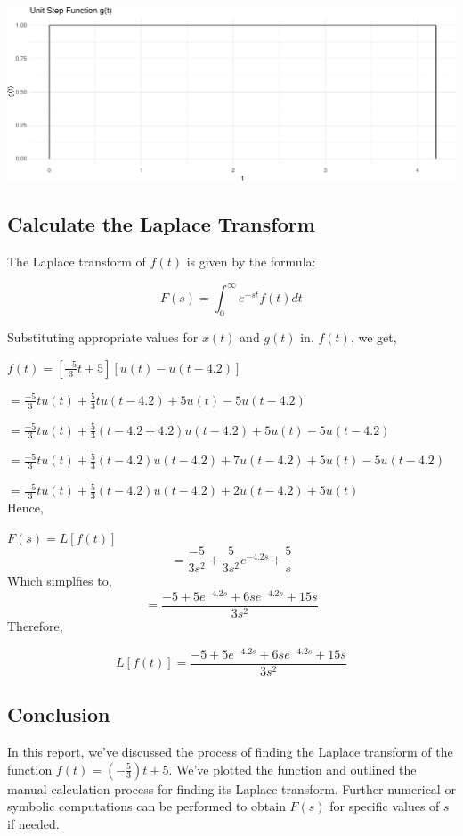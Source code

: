 \documentclass[
]{article}
\begin{document}
\includegraphics{laplace_transform_files/figure-latex/plot-function3-1.pdf}

\hypertarget{calculate-the-laplace-transform}{%
\subsection{Calculate the Laplace
Transform}\label{calculate-the-laplace-transform}}

The Laplace transform of \(f(t)\) is given by the formula:

\[ F(s) = \int_0^{\infty} e^{-st} f(t) dt \]

Substituting appropriate values for \(x(t)\) and \(g(t)\) in. \(f(t)\),
we get,

\(f(t) = [\frac{-5}{3}t + 5] [u(t) - u(t - 4.2)]\)

\(=\frac{-5}{3}t u(t) + \frac{5}{3}t u(t - 4.2) + 5u(t) - 5u(t - 4.2)\)

\(=\frac{-5}{3}t u(t) + \frac{5}{3}(t - 4.2 + 4.2)u(t - 4.2) + 5u(t) - 5u(t - 4.2)\)

\(=\frac{-5}{3}t u(t) + \frac{5}{3}(t - 4.2)u(t - 4.2) + 7u(t - 4.2) + 5u(t) - 5u(t-4.2)\)

\(=\frac{-5}{3}t u(t) + \frac{5}{3}(t - 4.2)u(t - 4.2) + 2u(t - 4.2) + 5u(t)\)\\

Hence,

\(F(s) = L[f(t)]\)
\[= \frac{-5}{3s^2} + \frac{5}{3s^2}e^{-4.2s} + \frac{5}{s}\] Which
simplfies to, \[=\frac{-5 + 5e^{-4.2s} + 6se^{-4.2s} + 15s}{3s^2}\]
Therefore,

\[L[f(t)] = \frac{-5 + 5e^{-4.2s} + 6se^{-4.2s} + 15s}{3s^2}\]

\hypertarget{conclusion}{%
\subsection{Conclusion}\label{conclusion}}

In this report, we've discussed the process of finding the Laplace
transform of the function \(f(t) = \left(-\frac{5}{3}\right)t + 5\).
We've plotted the function and outlined the manual calculation process
for finding its Laplace transform. Further numerical or symbolic
computations can be performed to obtain \(F(s)\) for specific values of
\(s\) if needed.
\end{document}
